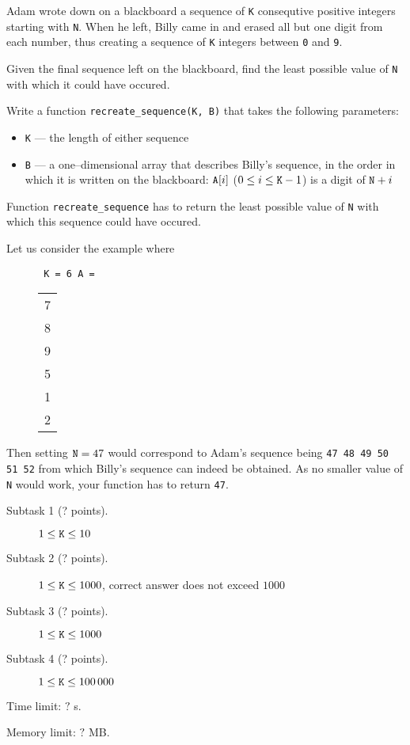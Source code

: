 \documentclass{boi2014}
\newcommand{\param}[1]{{\tt #1}}
\newcommand{\method}[1]{{\tt #1}}
\newcommand{\constant}[1]{{\tt #1}}
\begin{document}
    Adam wrote down on a blackboard a sequence of \param{K} consequtive
    positive integers starting with \param{N}. When he left, Billy came
    in and erased all but one digit from each number, thus creating a
    sequence of \param{K} integers between \constant{0} and \constant{9}.

    \Task

    Given the final sequence left on the blackboard, find the least
    possible value of \param{N} with which it could have occured.

    \Implementation

    Write a function \method{recreate\_sequence(K, B)} that takes
    the following parameters:
    \begin{itemize}
        \item \param{K} --- the length of either sequence
        \item \param{B} --- a one--dimensional array that describes
                            Billy's sequence, in the order in which
                            it is written on the blackboard: $\param{A}[i]$
                            ($0 \le i \le \param{K}-1$) is a digit
                            of $\param{N}+i$
    \end{itemize}

    Function \method{recreate\_sequence} has to return the least possible
    value of \param{N} with which this sequence could have occured.

    \Example

    Let us consider the example where
    \begin{figure}[H]
        \centering
        \constant{%
            \param{K} = 6
            \;
            \param{A} =%
            \begin{tabular}{c}
                7\\8\\9\\5\\1\\2
            \end{tabular}
        }
    \end{figure}

    Then setting $\param{N}=47$ would correspond to Adam's sequence
    being \constant{47 48 49 50 51 52} from which Billy's sequence
    can indeed be obtained. As no smaller value of \param{N}
    would work, your function has to return \constant{47}.

\Scoring

\begin{description}
    \item[Subtask 1 (? points).] $1 \le \param{K} \le 10$
    \item[Subtask 2 (? points).] $1 \le \param{K} \le 1000$, correct
        answer does not exceed $1000$
    \item[Subtask 3 (? points).] $1 \le \param{K} \le 1000$
    \item[Subtask 4 (? points).] $1 \le \param{K} \le 100\,000$
\end{description}

\Constraints

Time limit: $?$ s.

Memory limit: $?$ MB.
\end{document}
